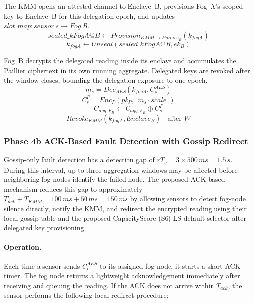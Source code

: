\documentclass[conference]{IEEEtran}
\begin{document}
    The KMM opens an attested channel to Enclave~B, provisions Fog~A's scoped key to Enclave~B for this delegation epoch, and updates $slot\_map:sensor~s\rightarrow Fog~B$.
    \begin{equation}
    sealed\_kFogA@B \leftarrow Provision_{KMM\rightarrow Enclave_B}(k_{fogA})
    \end{equation}
    \begin{equation}
    k_{fogA} \leftarrow Unseal(sealed\_kFogA@B,ek_B)
    \end{equation}

    Fog~B decrypts the delegated reading inside its enclave and accumulates the Paillier ciphertext in its own running aggregate. Delegated keys are revoked after the window closes, bounding the delegation exposure to one epoch.
    \begin{equation}
    m_s = Dec_{AES}(k_{fogA}, C_s^{AES})
    \end{equation}
    \begin{equation}
    C_s^P = Enc_P(pk_P, \lfloor m_s \cdot scale \rceil)
    \end{equation}
    \begin{equation}
    C_{agg,F_B} \leftarrow C_{agg,F_B} \oplus C_s^P
    \end{equation}
    \begin{equation}
    Revoke_{KMM}(k_{fogA}, Enclave_B)\quad \text{after } W
    \end{equation}

    \subsubsection{\textbf{Phase 4b ACK-Based Fault Detection with Gossip Redirect}}

    Gossip-only fault detection has a detection gap of $rT_g=3\times 500\,ms=1.5\,s$. During this interval, up to three aggregation windows may be affected before neighboring fog nodes identify the failed node. The proposed ACK-based mechanism reduces this gap to approximately $T_{ack}+T_{KMM}=100\,ms+50\,ms=150\,ms$ by allowing sensors to detect fog-node silence directly, notify the KMM, and redirect the encrypted reading using their local gossip table and the proposed CapacityScore (S6) LS-default selector after delegated key provisioning.

    \paragraph{Operation.}
    Each time a sensor sends $C_i^{AES}$ to its assigned fog node, it starts a short ACK timer. The fog node returns a lightweight acknowledgement immediately after receiving and queuing the reading. If the ACK does not arrive within $T_{ack}$, the sensor performs the following local redirect procedure:
\end{document}
